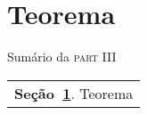 \section{Teorema} %
\label{sec:teorema}

\begin{margintable}\vspace{.8in}\footnotesize
  \caption{Sumário da \textsc{part III}}
  \medskip
  \begin{tabularx}{\marginparwidth}{|X}
    \textbf{\sffamily \textcolor{azulUFRB}{Seção}~\ref{sec:teorema}}. {\sffamily Teorema} \\
  \end{tabularx}
\end{margintable}
